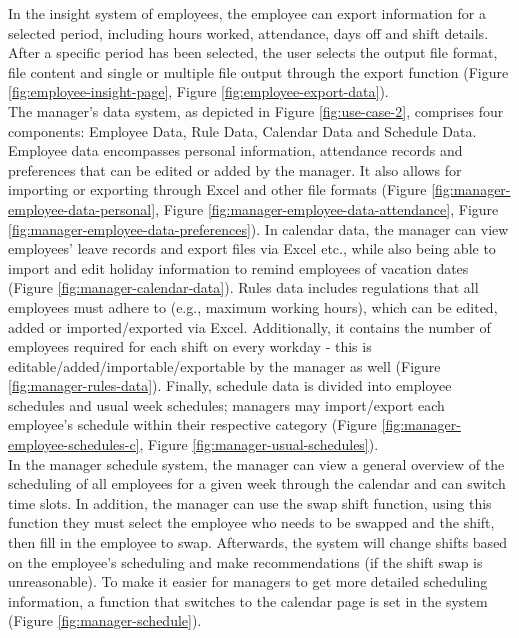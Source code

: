 \documentclass[a4paper,12pt, oneside]{report}
\begin{document}
In the insight system of employees, the employee can export information for a selected period, including hours worked, attendance, days off and shift details. After a specific period has been selected, the user selects the output file format, file content and single or multiple file output through the export function (Figure \ref{fig:employee-insight-page}, Figure \ref{fig:employee-export-data}).\\

The manager's data system, as depicted in Figure \ref{fig:use-case-2}, comprises four components: Employee Data, Rule Data, Calendar Data and Schedule Data. Employee data encompasses personal information, attendance records and preferences that can be edited or added by the manager. It also allows for importing or exporting through Excel and other file formats (Figure \ref{fig:manager-employee-data-personal}, Figure \ref{fig:manager-employee-data-attendance}, Figure \ref{fig:manager-employee-data-preferences}). In calendar data, the manager can view employees' leave records and export files via Excel etc., while also being able to import and edit holiday information to remind employees of vacation dates (Figure \ref{fig:manager-calendar-data}). Rules data includes regulations that all employees must adhere to (e.g., maximum working hours), which can be edited, added or imported/exported via Excel. Additionally, it contains the number of employees required for each shift on every workday - this is editable/added/importable/exportable by the manager as well (Figure \ref{fig:manager-rules-data}). Finally, schedule data is divided into employee schedules and usual week schedules; managers may import/export each employee's schedule within their respective category (Figure \ref{fig:manager-employee-schedules-c}, Figure \ref{fig:manager-usual-schedules}).\\

In the manager schedule system, the manager can view a general overview of the scheduling of all employees for a given week through the calendar and can switch time slots. In addition, the manager can use the swap shift function, using this function they must select the employee who needs to be swapped and the shift, then fill in the employee to swap. Afterwards, the system will change shifts based on the employee's scheduling and make recommendations (if the shift swap is unreasonable). To make it easier for managers to get more detailed scheduling information, a function that switches to the calendar page is set in the system (Figure \ref{fig:manager-schedule}).\\
\end{document}
